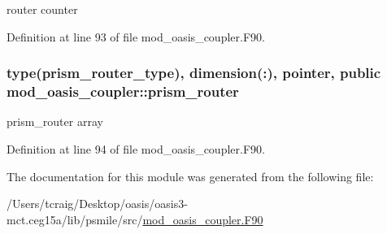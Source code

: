 router counter 



Definition at line 93 of file mod\+\_\+oasis\+\_\+coupler.\+F90.

\hypertarget{classmod__oasis__coupler_a33dbf692ad73f83f73fe083e252badd8}{
\subsubsection[{prism\+\_\+router}]{\setlength{\rightskip}{0pt plus 5cm}type({\bf prism\+\_\+router\+\_\+type}), dimension(\+:), pointer, public mod\+\_\+oasis\+\_\+coupler\+::prism\+\_\+router}}\label{classmod__oasis__coupler_a33dbf692ad73f83f73fe083e252badd8}


prism\+\_\+router array 



Definition at line 94 of file mod\+\_\+oasis\+\_\+coupler.\+F90.



The documentation for this module was generated from the following file\+:\begin{DoxyCompactItemize}
\item 
/\+Users/tcraig/\+Desktop/oasis/oasis3-\/mct.\+ceg15a/lib/psmile/src/\hyperlink{mod__oasis__coupler_8_f90}{mod\+\_\+oasis\+\_\+coupler.\+F90}\end{DoxyCompactItemize}
